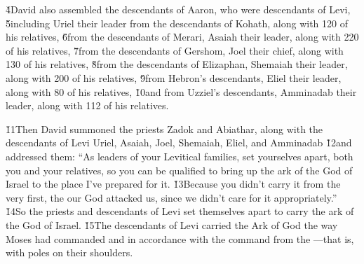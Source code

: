 \v{4}David also assembled the descendants of Aaron, who were descendants of Levi, \v{5}including Uriel their leader from the descendants of Kohath, along with 120 of his relatives, \v{6}from the descendants of Merari, Asaiah their leader, along with 220 of his relatives, \v{7}from the descendants of Gershom, Joel their chief, along with 130 of his relatives, \v{8}from the descendants of Elizaphan, Shemaiah their leader, along with 200 of his relatives, \v{9}from Hebron's descendants, Eliel their leader, along with 80 of his relatives, \v{10}and from Uzziel's descendants, Amminadab their leader, along with 112 of his relatives.

\v{11}Then David summoned the priests Zadok and Abiathar, along with the descendants of Levi Uriel, Asaiah, Joel, Shemaiah, Eliel, and Amminadab \v{12}and addressed them: ``As leaders of your Levitical families, set yourselves apart, both you and your relatives, so you can be qualified to bring up the ark of the  God of Israel to the place I've prepared for it. \v{13}Because you didn't carry it from the very first, the  our God attacked us, since we didn't care for it appropriately.'' \v{14}So the priests and descendants of Levi set themselves apart to carry the ark of the  God of Israel. \v{15}The descendants of Levi carried the Ark of God the way Moses had commanded and in accordance with the command from the ---that is, with poles on their shoulders.

